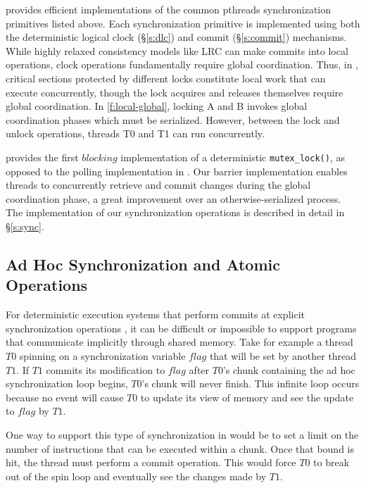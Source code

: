 \lib{} provides efficient implementations of the common pthreads synchronization primitives listed above. Each synchronization primitive is implemented using both the deterministic logical clock (\S\ref{s:dlc}) and commit (\S\ref{s:commit}) mechanisms. While highly relaxed consistency models like LRC can make commits into local operations, clock operations fundamentally require global coordination. Thus, in \lib{}, critical sections protected by different locks constitute local work that can execute concurrently, though the lock acquires and releases themselves require global coordination. In \autoref{f:local-global}, locking A and B invokes global coordination phases which must be serialized. However, between the lock and unlock operations, threads T0 and T1 can run concurrently. 

\lib{} provides the first $blocking$ implementation of a deterministic {\tt mutex\_lock()}, as opposed to the polling implementation in \cite{olszewski_kendo:_2009}. Our barrier implementation enables threads to concurrently retrieve and commit changes during the global coordination phase, a great improvement over an otherwise-serialized process. The implementation of our synchronization operations is described in detail in \S\ref{s:sync}.

\subsection{Ad Hoc Synchronization and Atomic Operations}
\label{s:adhoc}

For deterministic execution systems that perform commits at explicit synchronization operations \cite{liu_dthreads:_2011,merrifield_conversion:_2013,kai_lu_efficient_2014}, it can be difficult or impossible to support programs that communicate implicitly through shared memory. Take for example a thread $T0$ spinning on a synchronization variable $flag$ that will be set by another thread $T1$. If $T1$ commits its modification to $flag$ after $T0$'s chunk containing the ad hoc synchronization loop begins, $T0$'s chunk will never finish. This infinite loop occurs because no event will cause $T0$ to update its view of memory and see the update to $flag$ by $T1$.

One way to support this type of synchronization in \lib{} would be to set a limit on the number of instructions that can be executed within a chunk. Once that bound is hit, the thread must perform a commit operation. This would force $T0$ to break out of the spin loop and eventually see the changes made by $T1$. 

